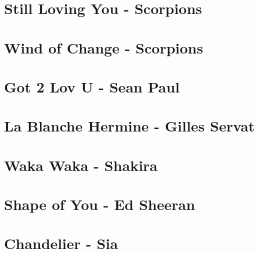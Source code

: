 \documentclass[11pt]{article}
\begin{document}
\section{Still Loving You - Scorpions}
\begin{guitar}

\end{guitar}

\section*{Wind of Change - Scorpions}
\begin{guitar}

\end{guitar}

\section{Got 2 Lov U - Sean Paul}
\begin{guitar}

\end{guitar}



\section{La Blanche Hermine - Gilles Servat}
\begin{guitar}

\end{guitar}

\section{Waka Waka - Shakira}
\begin{guitar}

\end{guitar}

\section{Shape of You - Ed Sheeran}
\begin{guitar}

\end{guitar}



\section{Chandelier - Sia}
\begin{guitar}

\end{guitar}
\end{document}
